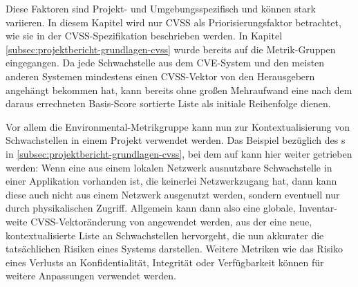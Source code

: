 Diese Faktoren sind Projekt- und Umgebungsspezifisch und können stark variieren.
In diesem Kapitel wird nur CVSS als Priorisierungsfaktor betrachtet, wie sie in der CVSS-Spezifikation beschrieben werden.
In Kapitel \ref{subsec:projektbericht-grundlagen-cvss} wurde bereits auf die Metrik-Gruppen eingegangen.
Da jede Schwachstelle aus dem CVE-System und den meisten anderen Systemen mindestens einen CVSS-Vektor von den Herausgebern angehängt bekommen hat, kann bereits ohne großen Mehraufwand eine nach dem daraus errechneten Basis-Score sortierte Liste als initiale Reihenfolge dienen.

Vor allem die Environmental-Metrikgruppe kann nun zur Kontextualisierung von Schwachstellen in einem Projekt verwendet werden.
Das Beispiel bezüglich des s in \ref{subsec:projektbericht-grundlagen-cvss}, bei dem  auf  kann hier weiter getrieben werden:
Wenn eine aus einem lokalen Netzwerk ausnutzbare Schwachstelle in einer Applikation vorhanden ist, die keinerlei Netzwerkzugang hat, dann kann diese auch nicht aus einem Netzwerk ausgenutzt werden, sondern eventuell nur durch physikalischen Zugriff.
Allgemein kann dann also eine globale, Inventar-weite CVSS-Vektoränderung von  angewendet werden, aus der eine neue, kontextualisierte Liste an Schwachstellen hervorgeht, die nun akkurater die tatsächlichen Risiken eines Systems darstellen.
Weitere Metriken wie das Risiko eines Verlusts an Konfidentialität, Integrität oder Verfügbarkeit können für weitere Anpassungen verwendet werden.
